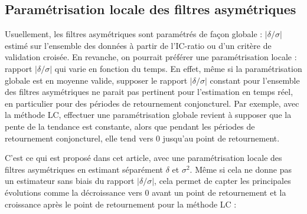 \documentclass[
  12pt,
  a4paper,french]{article}
\newcommand\1{\mathds{1}}
\begin{document}
\hypertarget{subsec-localic}{%
\subsection{Paramétrisation locale des filtres asymétriques}\label{subsec-localic}}

Usuellement, les filtres asymétriques sont paramétrés de façon globale : \(\lvert\delta/\sigma\rvert\) estimé sur l'ensemble des données à partir de l'IC-ratio ou d'un critère de validation croisée.
En revanche, on pourrait préférer une paramétrisation locale : rapport \(\lvert\delta/\sigma\rvert\) qui varie en fonction du temps.
En effet, même si la paramétrisation globale est en moyenne valide, supposer le rapport \(\lvert\delta/\sigma\rvert\) constant pour l'ensemble des filtres asymétriques ne parait pas pertinent pour l'estimation en temps réel, en particulier pour des périodes de retournement conjoncturel.
Par exemple, avec la méthode LC, effectuer une paramétrisation globale revient à supposer que la pente de la tendance est constante, alors que pendant les périodes de retournement conjoncturel, elle tend vers 0 jusqu'au point de retournement.

C'est ce qui est proposé dans cet article, avec une paramétrisation locale des filtres asymétriques en estimant séparément \(\delta\) et \(\sigma^2\).
Même si cela ne donne pas un estimateur sans biais du rapport \(\lvert\delta/\sigma\rvert\), cela permet de capter les principales évolutions comme la décroissance vers 0 avant un point de retournement et la croissance après le point de retournement pour la méthode LC :
\end{document}
